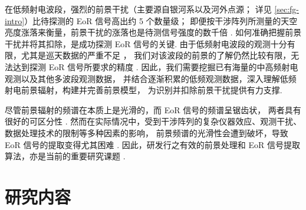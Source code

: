 在低频射电波段，强烈的前景干扰（主要源自银河系以及河外点源；
详见 \autoref{sec:fg-intro}）比待探测的 EoR 信号高出约 5 个数量级；
即便按干涉阵列所测量的天空亮度涨落来衡量，前景干扰的涨落也是待测信号强度的数千倍
\cite{zaroubi2013}.
如何准确把握前景干扰并将其扣除，是成功探测 EoR 信号的关键.
由于低频射电波段的观测十分有限，尤其是巡天数据的严重不足
\cite{deOliveiraCosta2008,zheng2017gal}，
我们对该波段的前景的了解仍然比较有限，无法达到探测 EoR 信号所要求的精度
\cite{liu2012,harker2015,offringa2016,murray2017,procopio2017}.
因此，我们需要挖掘已有海量的中高频射电观测以及其他多波段观测数据，
并结合逐渐积累的低频观测数据，深入理解低频射电前景辐射，构建并完善前景模型，
为识别并扣除前景干扰提供有力支撑.

尽管前景辐射的频谱在本质上是光滑的，而 EoR 信号的频谱呈锯齿状，
两者具有很好的可区分性 \cite{wang2006,jelic2008,harker2009,wang2013}.
然而在实际情况中，受到干涉阵列的复杂仪器效应、观测干扰、
数据处理技术的限制等多种因素的影响，
前景频谱的光滑性会遭到破坏，导致 EoR 信号的提取变得尤其困难
\cite{liu2009ps,labropoulos2009,gehlot2018,mertens2018}.
因此，研发行之有效的前景处理和 EoR 信号提取算法，亦是当前的重要研究课题
\cite{chapman2016,pober2016,zhang2016,thyagarajan2018}.


\section{研究内容}

